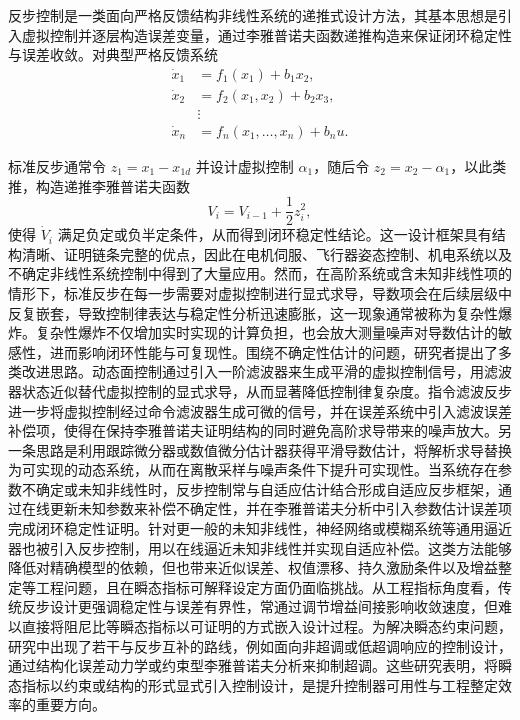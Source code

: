 反步控制是一类面向严格反馈结构非线性系统的递推式设计方法，其基本思想是引入虚拟控制并逐层构造误差变量，通过李雅普诺夫函数递推构造来保证闭环稳定性与误差收敛\cite{ref1}。对典型严格反馈系统
\begin{subequations}\label{eq:intro_strict_feedback}
\begin{align}
\dot x_1 &= f_1(x_1) + b_1 x_2,\label{eq:intro_strict_feedback_a}\\
\dot x_2 &= f_2(x_1,x_2) + b_2 x_3,\label{eq:intro_strict_feedback_b}\\
&\vdots\nonumber\\
\dot x_n &= f_n(x_1,\ldots,x_n) + b_n u.\label{eq:intro_strict_feedback_c}
\end{align}
\end{subequations}

标准反步通常令 $z_1 = x_1 - x_{1d}$ 并设计虚拟控制 $\alpha_1$，随后令 $z_2 = x_2 - \alpha_1$，以此类推，构造递推李雅普诺夫函数
\begin{equation}
V_i = V_{i-1} + \frac{1}{2}z_i^2,
\end{equation}
使得 $\dot V_i$ 满足负定或负半定条件，从而得到闭环稳定性结论\cite{ref1}。这一设计框架具有结构清晰、证明链条完整的优点，因此在电机伺服、飞行器姿态控制、机电系统以及不确定非线性系统控制中得到了大量应用\cite{ref1,ref19,ref20}。然而，在高阶系统或含未知非线性项的情形下，标准反步在每一步需要对虚拟控制进行显式求导，导数项会在后续层级中反复嵌套，导致控制律表达与稳定性分析迅速膨胀，这一现象通常被称为复杂性爆炸\cite{ref2}。复杂性爆炸不仅增加实时实现的计算负担，也会放大测量噪声对导数估计的敏感性，进而影响闭环性能与可复现性\cite{ref2}。围绕不确定性估计的问题，研究者提出了多类改进思路。动态面控制通过引入一阶滤波器来生成平滑的虚拟控制信号，用滤波器状态近似替代虚拟控制的显式求导，从而显著降低控制律复杂度\cite{ref3}。指令滤波反步进一步将虚拟控制经过命令滤波器生成可微的信号，并在误差系统中引入滤波误差补偿项，使得在保持李雅普诺夫证明结构的同时避免高阶求导带来的噪声放大\cite{ref5,ref74,ref76,ref77}。另一条思路是利用跟踪微分器或数值微分估计器获得平滑导数估计，将解析求导替换为可实现的动态系统，从而在离散采样与噪声条件下提升可实现性\cite{ref6,ref7}。当系统存在参数不确定或未知非线性时，反步控制常与自适应估计结合形成自适应反步框架，通过在线更新未知参数来补偿不确定性，并在李雅普诺夫分析中引入参数估计误差项完成闭环稳定性证明\cite{ref19,ref20,ref21,ref78}。针对更一般的未知非线性，神经网络或模糊系统等通用逼近器也被引入反步控制，用以在线逼近未知非线性并实现自适应补偿\cite{ref25,ref26,ref27,ref28,ref82}。这类方法能够降低对精确模型的依赖，但也带来近似误差、权值漂移、持久激励条件以及增益整定等工程问题，且在瞬态指标可解释设定方面仍面临挑战\cite{ref25,ref27,ref28,ref82}。从工程指标角度看，传统反步设计更强调稳定性与误差有界性，常通过调节增益间接影响收敛速度，但难以直接将阻尼比等瞬态指标以可证明的方式嵌入设计过程\cite{ref1,ref2}。为解决瞬态约束问题，研究中出现了若干与反步互补的路线，例如面向非超调或低超调响应的控制设计，通过结构化误差动力学或约束型李雅普诺夫分析来抑制超调\cite{ref37,ref42,ref43,ref64,ref66,ref79}。这些研究表明，将瞬态指标以约束或结构的形式显式引入控制设计，是提升控制器可用性与工程整定效率的重要方向。

